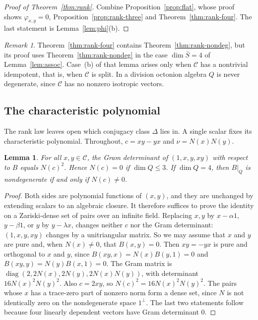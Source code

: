 \documentclass[11pt]{amsart}
\newtheorem{lemma}[theorem]{Lemma}
\theoremstyle{definition}
\theoremstyle{remark}
\newtheorem{remark}[theorem]{Remark}
\newcommand{\C}{\mathcal{C}}
\begin{document}
\begin{proof}[Proof of Theorem~\ref{thm:rank}]
Combine Proposition~\ref{prop:flat}, whose proof shows $\varphi_{x,y}=0$,
Proposition~\ref{prop:rank-three} and Theorem~\ref{thm:rank-four}. The last
statement is Lemma~\ref{lem:phi}(b).
\end{proof}

\begin{remark}
Theorem~\ref{thm:rank-four} contains Theorem~\ref{thm:rank-nondeg}, but its
proof uses Theorem~\ref{thm:rank-nondeg} in the case $\dim\bar S=4$ of
Lemma~\ref{lem:assoc}. Case~(b) of that lemma arises only when $\C$ has a
nontrivial idempotent, that is, when $\C$ is split. In a division octonion
algebra $Q$ is never degenerate, since $\C$ has no nonzero isotropic vectors.
\end{remark}

\subsection*{The characteristic polynomial}
The rank law leaves open which conjugacy class $\Delta$ lies in. A single
scalar fixes its characteristic polynomial. Throughout, $c=xy-yx$ and
$\nu=N(x)N(y)$.

\begin{lemma}\label{lem:gram}
For all $x,y\in\C$, the Gram determinant of $(1,x,y,xy)$ with respect to $B$
equals $N(c)^2$. Hence $N(c)=0$ if $\dim Q\le3$. If $\dim Q=4$, then $B|_Q$ is
nondegenerate if and only if $N(c)\neq0$.
\end{lemma}

\begin{proof}
Both sides are polynomial functions of $(x,y)$, and they are unchanged by
extending scalars to an algebraic closure. It therefore suffices to prove the
identity on a Zariski-dense set of pairs over an infinite field. Replacing
$x,y$ by $x-\alpha1$, $y-\beta1$, or $y$ by $y-\lambda x$, changes neither $c$
nor the Gram determinant: $(1,x,y,xy)$ changes by a unitriangular matrix. So
we may assume that $x$ and $y$ are pure and, when $N(x)\neq0$, that $B(x,y)=0$.
Then $xy=-yx$ is pure and orthogonal to $x$ and $y$, since
$B(xy,x)=N(x)B(y,1)=0$ and $B(xy,y)=N(y)B(x,1)=0$. The Gram matrix is
$\operatorname{diag}(2,2N(x),2N(y),2N(x)N(y))$, with determinant
$16N(x)^2N(y)^2$. Also $c=2xy$, so $N(c)^2=16N(x)^2N(y)^2$. The pairs whose
$x$ has a trace-zero part of nonzero norm form a dense set, since $N$ is not
identically zero on the nondegenerate space $1^\perp$. The last two statements follow because four linearly
dependent vectors have Gram determinant $0$.
\end{proof}
\end{document}

